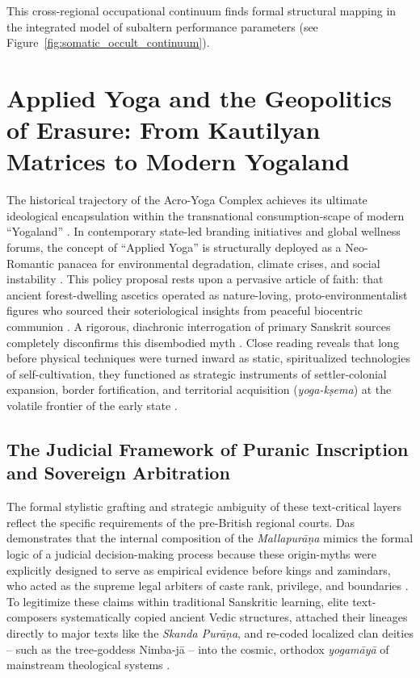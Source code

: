 \documentclass[11pt,twoside,letterpaper]{article}
\begin{document}
This cross-regional occupational continuum finds formal structural mapping in the integrated model of subaltern performance parameters (see Figure~\ref{fig:somatic_occult_continuum}).


\section{Applied Yoga and the Geopolitics of Erasure: From Kautilyan Matrices to Modern Yogaland}
The historical trajectory of the Acro-Yoga Complex achieves its ultimate ideological encapsulation within the transnational consumption-scape of modern ``Yogaland'' \citep{McCartney2021}. In contemporary state-led branding initiatives and global wellness forums, the concept of ``Applied Yoga'' is structurally deployed as a Neo-Romantic panacea for environmental degradation, climate crises, and social instability \citep{McCartney2021}. This policy proposal rests upon a pervasive article of faith: that ancient forest-dwelling ascetics operated as nature-loving, proto-environmentalist figures who sourced their soteriological insights from peaceful biocentric communion \citep{McCartney2021}. A rigorous, diachronic interrogation of primary Sanskrit sources completely disconfirms this disembodied myth \citep{Birch2024, McCartney2021}. Close reading reveals that long before physical techniques were turned inward as static, spiritualized technologies of self-cultivation, they functioned as strategic instruments of settler-colonial expansion, border fortification, and territorial acquisition (\textit{yoga-kṣema}) at the volatile frontier of the early state \citep{Birch2024, McCartney2021}.

\subsection{The Judicial Framework of Puranic Inscription and Sovereign Arbitration}
The formal stylistic grafting and strategic ambiguity of these text-critical layers reflect the specific requirements of the pre-British regional courts. Das demonstrates that the internal composition of the \textit{Mallapurāṇa} mimics the formal logic of a judicial decision-making process because these origin-myths were explicitly designed to serve as empirical evidence before kings and zamindars, who acted as the supreme legal arbiters of caste rank, privilege, and boundaries \citep{Das1968}. To legitimize these claims within traditional Sanskritic learning, elite text-composers systematically copied ancient Vedic structures, attached their lineages directly to major texts like the \textit{Skanda Purāṇa}, and re-coded localized clan deities -- such as the tree-goddess Nimba-jā -- into the cosmic, orthodox \textit{yogamāyā} of mainstream theological systems \citep{Das1968}.
\end{document}
